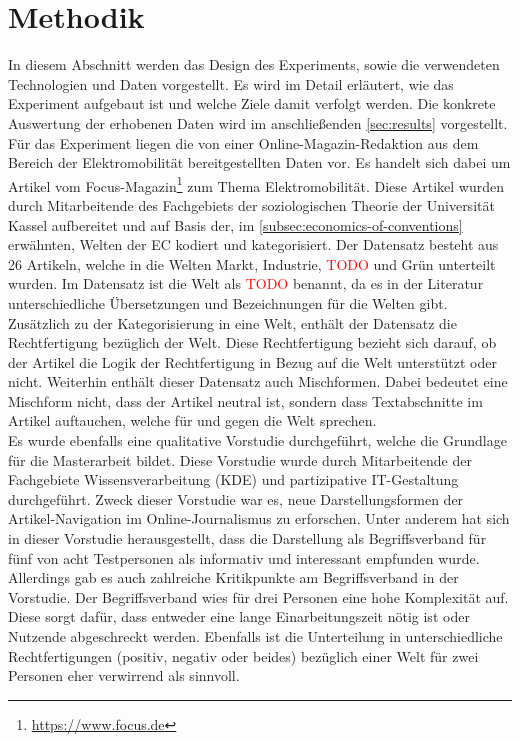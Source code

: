 \section{Methodik}\label{sec:method}
In diesem Abschnitt werden das Design des Experiments, sowie die verwendeten Technologien und Daten vorgestellt.
Es wird im Detail erläutert, wie das Experiment aufgebaut ist und welche Ziele damit verfolgt werden.
Die konkrete Auswertung der erhobenen Daten wird im anschließenden \autoref{sec:results} vorgestellt.\\

Für das Experiment liegen die von einer Online-Magazin-Redaktion aus dem Bereich der Elektromobilität bereitgestellten Daten vor.
Es handelt sich dabei um Artikel vom Focus-Magazin\footnote{\url{https://www.focus.de}} zum Thema Elektromobilität.
Diese Artikel wurden durch Mitarbeitende des Fachgebiets der soziologischen Theorie der Universität Kassel aufbereitet und auf Basis der, im \autoref{subsec:economics-of-conventions} erwähnten, Welten der \ac{EC} kodiert und kategorisiert.
Der Datensatz besteht aus 26 Artikeln, welche in die Welten Markt, Industrie, \textcolor{red}{TODO} und Grün unterteilt wurden.
Im Datensatz ist die Welt als \textcolor{red}{TODO} benannt, da es in der Literatur unterschiedliche Übersetzungen und Bezeichnungen für die Welten gibt.
Zusätzlich zu der Kategorisierung in eine Welt, enthält der Datensatz die Rechtfertigung bezüglich der Welt.
Diese Rechtfertigung bezieht sich darauf, ob der Artikel die Logik der Rechtfertigung in Bezug auf die Welt unterstützt oder nicht.
Weiterhin enthält dieser Datensatz auch Mischformen.
Dabei bedeutet eine Mischform nicht, dass der Artikel neutral ist, sondern dass Textabschnitte im Artikel auftauchen, welche für und gegen die Welt sprechen.\\

Es wurde ebenfalls eine qualitative Vorstudie durchgeführt, welche die Grundlage für die Masterarbeit bildet.
Diese Vorstudie wurde durch Mitarbeitende der Fachgebiete Wissensverarbeitung (KDE) und partizipative IT-Gestaltung durchgeführt.
Zweck dieser Vorstudie war es, neue Darstellungsformen der Artikel-Navigation im Online-Journalismus zu erforschen.
Unter anderem hat sich in dieser Vorstudie herausgestellt, dass die Darstellung als Begriffsverband für fünf von acht Testpersonen als informativ und interessant empfunden wurde.
Allerdings gab es auch zahlreiche Kritikpunkte am Begriffsverband in der Vorstudie.
Der Begriffsverband wies für drei Personen eine hohe Komplexität auf.
Diese sorgt dafür, dass entweder eine lange Einarbeitungszeit nötig ist oder Nutzende abgeschreckt werden.
Ebenfalls ist die Unterteilung in unterschiedliche Rechtfertigungen (positiv, negativ oder beides) bezüglich einer Welt für zwei Personen eher verwirrend als sinnvoll.\\

